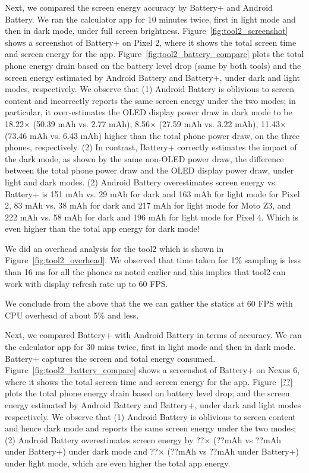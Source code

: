 Next, we compared the screen energy accuracy by 
Battery+ and Android Battery.
We ran the calculator app for 10 minutes twice, first in light mode and then in
dark mode, under full screen brightness.
Figure~\ref{fig:tool2_screenshot} shows a screenshot of
Battery+ on Pixel 2, where it shows the total screen time and screen energy
for the app.
Figure~\ref{fig:tool2_battery_compare} plots the
total phone energy drain based on the battery level drop (same by  both tools)
and the screen energy estimated by Android Battery and Battery+,
under dark and light modes, respectively.
We observe that
(1) Android Battery is oblivious to screen content and incorrectly reports
the same screen energy under the two modes;
in particular, it over-estimates the  OLED display power draw in dark mode
to be 18.22$\times$ (50.39 mAh vs. 2.77 mAh), 
8.56$\times$ (27.59 mAh vs. 3.22 mAh), 
11.43$\times$ (73.46 mAh vs. 6.43 mAh)
higher than the total phone power draw, on the three phones, respectively.
(2) In contrast, Battery+ correctly estimates the impact of the dark mode,
as shown by the same non-OLED power draw, \ie the difference 
between the total phone power draw and the OLED display power draw,
under light and dark modes.
(2) Android Battery overestimates screen energy vs. Battery+ is
151 mAh vs. 29 mAh for dark and 163 mAh for light mode for Pixel 2,
83 mAh vs. 38 mAh for dark and 217 mAh for light mode for Moto Z3, and
222 mAh vs. 58 mAh for dark and 196 mAh for light mode for Pixel 4.
Which is even higher than the total app energy for dark mode!
\fi

We did an overhead analysis for the tool2 which is shown in Figure~\ref{fig:tool2_overhead}.
We observed that time taken for 1\% sampling is less than 16 ms for all the phones
as noted earlier and this  implies that tool2 can work with display refresh rate up to 60 FPS.

We conclude from the above that the we can gather the statics at
60 FPS with CPU overhead of about 5\% and less.

Next, we compared Battery+ with Android Battery in terms of accuracy.
We ran the calculator app for 30 mins twice, first in light mode and then in
dark mode. Battery+ captures the screen and total energy
consumed. 
Figure~\ref{fig:tool2_battery_compare} shows a screenshot of
Battery+ on Nexus 6, where it shows the total screen time and screen energy
for the app.
Figure~\ref{??} plots the
total phone energy drain based on battery level drop;
and the screen energy estimated by Android Battery and Battery+,
under dark and light modes respectively.
We observe that
(1) Android Battery is oblivious to screen content and hence
dark mode and reports the same screen energy under the two modes;
(2) Android Battery overestimates screen energy
by ??$\times$ (??mAh vs ??mAh under Battery+) under dark mode
and ??$\times$ (??mAh vs ??mAh under Battery+) under light mode,
which are even higher the total app energy.
\fi

